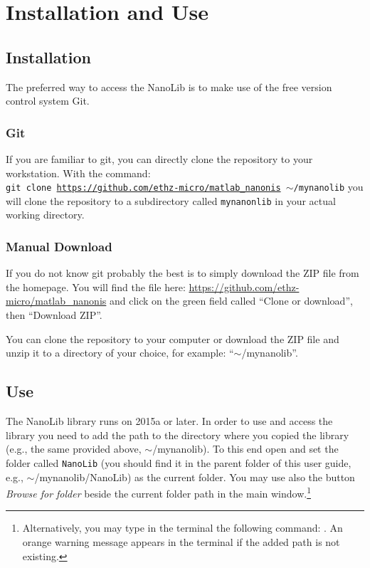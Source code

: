\section{Installation and Use}

\subsection{Installation}

The preferred way to access the NanoLib is to make use of the free version control system Git.

\subsubsection{Git} \label{git-install}
If you are familiar to git, you can directly clone the repository to your workstation. With the command: \\
\texttt{git clone \url{https://github.com/ethz-micro/matlab_nanonis} $\sim$/mynanolib} you will clone the repository to a subdirectory called \texttt{mynanonlib} in your actual working directory.

\subsubsection{Manual Download} \label{man-install}
If you do not know git probably the best is to simply download the ZIP file from the homepage. You will find the file here: \url{https://github.com/ethz-micro/matlab_nanonis} and click on the green field called ``Clone or download'', then ``Download ZIP''.

You can clone the repository to your computer or download the ZIP file and unzip it to a directory of your choice, for example: ``$\sim$/mynanolib''.


\subsection{Use}

The NanoLib library runs on \matlab{} 2015a or later. 
In order to use and access the library you need to add the path to the directory where you copied the library (e.g., the same provided above, $\sim$/mynanolib).
To this end open \matlab{} and set the folder called \texttt{NanoLib} (you should find it in the parent folder of this user guide, e.g., $\sim$/mynanolib/NanoLib) as the \matlab{} current folder.
You may use also the button \emph{Browse for folder} beside the current folder path in the \matlab{} main window.\footnote{Alternatively, you may type in the \matlab{} terminal the following command: .
An orange warning message appears in the \matlab{} terminal if the added path is not existing.}


